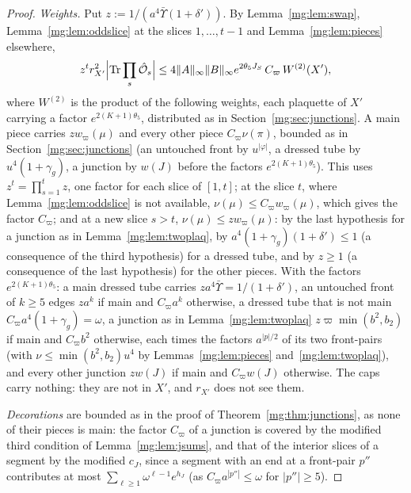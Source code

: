 \documentclass[11pt,a4paper]{article}
\theoremstyle{definition}
\theoremstyle{remark}
\DeclareMathOperator{\Tr}{Tr}
\newcommand{\norm}[1]{\lVert #1\rVert}
\begin{document}
\begin{proof}
\emph{Weights.} Put $z:=1/(a^4\bar\Upsilon(1+\delta'))$. By Lemma~\ref{mg:lem:swap}, Lemma~\ref{mg:lem:oddslice} at the slices $1,\dots,t-1$ and
Lemma~\ref{mg:lem:pieces} elsewhere,
\[
z^tr_{X'}^2\Bigl|\Tr\prod_s\hat{\mathcal O}_s\Bigr|\le4\norm A_\infty\norm B_\infty e^{2\theta_5J_S}\,C_\varpi\,W^{(2)}(X'),
\]
where $W^{(2)}$ is the product of the following weights, each plaquette of $X'$ carrying a factor $e^{2(K+1)\theta_5}$, distributed as in
Section~\ref{mg:sec:junctions}. A main piece carries $zw_\varpi(\mu)$ and every other piece $C_\varpi\nu(\pi)$, bounded as in Section~\ref{mg:sec:junctions} (an
untouched front by $u^{|\varphi|}$, a dressed tube by $u^4(1+\gamma_g)$, a junction by $w(J)$ before the factors $e^{2(K+1)\theta_5}$). This uses
$z^t=\prod_{s=1}^tz$, one factor for each slice of $[1,t]$; at the slice $t$, where Lemma~\ref{mg:lem:oddslice} is not available,
$\nu(\mu)\le C_\varpi w_\varpi(\mu)$, which gives the factor $C_\varpi$; and at a new slice $s>t$, $\nu(\mu)\le zw_\varpi(\mu)$: by the last hypothesis for a
junction as in Lemma~\ref{mg:lem:twoplaq}, by $a^4(1+\gamma_g)(1+\delta')\le1$ (a consequence of the third hypothesis) for a dressed tube, and by
$z\ge1$ (a consequence of the last hypothesis) for the other pieces. With the factors $e^{2(K+1)\theta_5}$: a main dressed tube carries $za^4\bar\Upsilon=
1/(1+\delta')$, an untouched front of $k\ge5$ edges $za^k$ if main and $C_\varpi a^k$ otherwise, a dressed tube that is not main
$C_\varpi a^4(1+\gamma_g)=\omega$, a junction as in Lemma~\ref{mg:lem:twoplaq} $z\varpi\min(b^2,b_2)$ if main and $C_\varpi b^2$ otherwise, each times the
factors $a^{|p|/2}$ of its two front-pairs (with $\nu\le\min(b^2,b_2)u^4$ by Lemmas~\ref{mg:lem:pieces} and~\ref{mg:lem:twoplaq}), and every other junction
$zw(J)$ if main and $C_\varpi w(J)$ otherwise. The caps carry nothing: they are not in $X'$, and $r_{X'}$ does not see them.

\emph{Decorations} are bounded as in the proof of Theorem~\ref{mg:thm:junctions}, as none of their pieces is main: the factor $C_\varpi$ of a junction is
covered by the modified third condition of Lemma~\ref{mg:lem:jsums}, and that of the interior slices of a segment by the modified $c_J$, since a segment
with an end at a front-pair $p''$ contributes at most $\sum_{\ell\ge1}\omega^{\ell-1}e^{h_J}$ (as $C_\varpi a^{|p''|}\le\omega$ for $|p''|\ge5$).


\end{proof}
\end{document}

